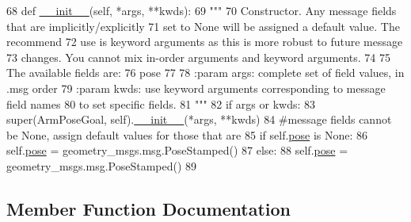 \begin{DoxyCode}
68   \textcolor{keyword}{def }\hyperlink{classjaco__msgs_1_1msg_1_1__ArmPoseGoal_1_1ArmPoseGoal_a5ac1bb131e60fcd9fc01cc39ce4342c6}{\_\_init\_\_}(self, *args, **kwds):
69     \textcolor{stringliteral}{"""}
70 \textcolor{stringliteral}{    Constructor. Any message fields that are implicitly/explicitly}
71 \textcolor{stringliteral}{    set to None will be assigned a default value. The recommend}
72 \textcolor{stringliteral}{    use is keyword arguments as this is more robust to future message}
73 \textcolor{stringliteral}{    changes.  You cannot mix in-order arguments and keyword arguments.}
74 \textcolor{stringliteral}{}
75 \textcolor{stringliteral}{    The available fields are:}
76 \textcolor{stringliteral}{       pose}
77 \textcolor{stringliteral}{}
78 \textcolor{stringliteral}{    :param args: complete set of field values, in .msg order}
79 \textcolor{stringliteral}{    :param kwds: use keyword arguments corresponding to message field names}
80 \textcolor{stringliteral}{    to set specific fields.}
81 \textcolor{stringliteral}{    """}
82     \textcolor{keywordflow}{if} args \textcolor{keywordflow}{or} kwds:
83       super(ArmPoseGoal, self).\hyperlink{classjaco__msgs_1_1msg_1_1__ArmPoseGoal_1_1ArmPoseGoal_a5ac1bb131e60fcd9fc01cc39ce4342c6}{\_\_init\_\_}(*args, **kwds)
84       \textcolor{comment}{#message fields cannot be None, assign default values for those that are}
85       \textcolor{keywordflow}{if} self.\hyperlink{classjaco__msgs_1_1msg_1_1__ArmPoseGoal_1_1ArmPoseGoal_ad25889b3ba293b0eba280014befdc9a6}{pose} \textcolor{keywordflow}{is} \textcolor{keywordtype}{None}:
86         self.\hyperlink{classjaco__msgs_1_1msg_1_1__ArmPoseGoal_1_1ArmPoseGoal_ad25889b3ba293b0eba280014befdc9a6}{pose} = geometry\_msgs.msg.PoseStamped()
87     \textcolor{keywordflow}{else}:
88       self.\hyperlink{classjaco__msgs_1_1msg_1_1__ArmPoseGoal_1_1ArmPoseGoal_ad25889b3ba293b0eba280014befdc9a6}{pose} = geometry\_msgs.msg.PoseStamped()
89 
\end{DoxyCode}


\subsection{Member Function Documentation}
